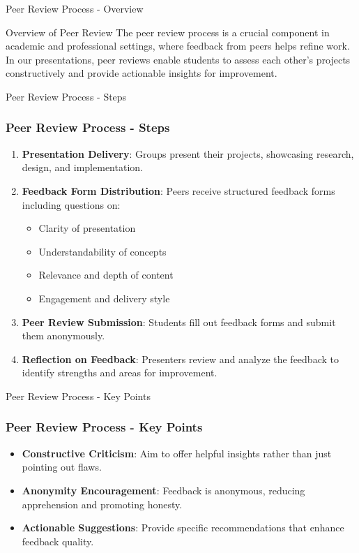 \documentclass[aspectratio=169]{beamer}
\begin{document}
\begin{frame}[fragile]{Peer Review Process - Overview}
    \begin{block}{Overview of Peer Review}
        The peer review process is a crucial component in academic and professional settings, where feedback from peers helps refine work. In our presentations, peer reviews enable students to assess each other's projects constructively and provide actionable insights for improvement.
    \end{block}
\end{frame}

\begin{frame}[fragile]{Peer Review Process - Steps}
    \frametitle{Peer Review Process - Steps}
    \begin{enumerate}
        \item \textbf{Presentation Delivery}: Groups present their projects, showcasing research, design, and implementation.
        
        \item \textbf{Feedback Form Distribution}: Peers receive structured feedback forms including questions on:
        \begin{itemize}
            \item Clarity of presentation
            \item Understandability of concepts
            \item Relevance and depth of content
            \item Engagement and delivery style
        \end{itemize}

        \item \textbf{Peer Review Submission}: Students fill out feedback forms and submit them anonymously.
        
        \item \textbf{Reflection on Feedback}: Presenters review and analyze the feedback to identify strengths and areas for improvement.
    \end{enumerate}
\end{frame}

\begin{frame}[fragile]{Peer Review Process - Key Points}
    \frametitle{Peer Review Process - Key Points}
    \begin{itemize}
        \item \textbf{Constructive Criticism}: Aim to offer helpful insights rather than just pointing out flaws.
        
        \item \textbf{Anonymity Encouragement}: Feedback is anonymous, reducing apprehension and promoting honesty.
        
        \item \textbf{Actionable Suggestions}: Provide specific recommendations that enhance feedback quality.
    \end{itemize}
\end{frame}
\end{document}
